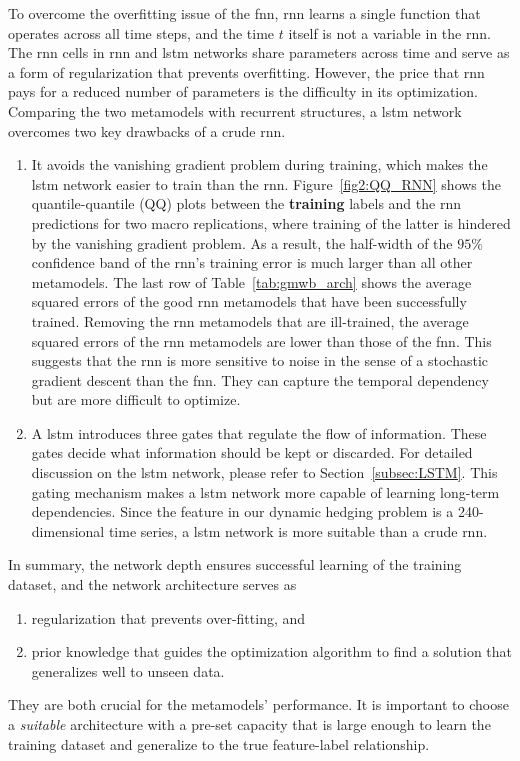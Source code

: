 To overcome the overfitting issue of the \gls{fnn}, \gls{rnn} learns a single function that operates across all time steps, and the time $t$ itself is not a variable in the \gls{rnn}.
The \gls{rnn} cells in \gls{rnn} and \gls{lstm} networks share parameters across time and serve as a form of regularization that prevents overfitting.
However, the price that \gls{rnn} pays for a reduced number of parameters is the difficulty in its optimization.
Comparing the two metamodels with recurrent structures, a \gls{lstm} network overcomes two key drawbacks of a crude \gls{rnn}.
\begin{enumerate}
    \item It avoids the vanishing gradient problem during training, which makes the \gls{lstm} network easier to train than the \gls{rnn}. Figure~\ref{fig2:QQ_RNN} shows the quantile-quantile (QQ) plots between the \textbf{training} labels and the \gls{rnn} predictions for two macro replications, where training of the latter is hindered by the vanishing gradient problem. 
    As a result, the half-width of the $95\%$ confidence band of the \gls{rnn}'s training error is much larger than all other metamodels. 
    The last row of Table~\ref{tab:gmwb_arch} shows the average squared errors of the good \gls{rnn} metamodels that have been successfully trained. 
    Removing the \gls{rnn} metamodels that are ill-trained, the average squared errors of the \gls{rnn} metamodels are lower than those of the \gls{fnn}.
    This suggests that the \gls{rnn} is more sensitive to noise in the sense of a stochastic gradient descent than the \gls{fnn}.
    They can capture the temporal dependency but are more difficult to optimize.
    \item A \gls{lstm} introduces three gates that regulate the flow of information. 
    These gates decide what information should be kept or discarded.
    For detailed discussion on the \gls{lstm} network, please refer to Section~\ref{subsec:LSTM}.
    This gating mechanism makes a \gls{lstm} network more capable of learning long-term dependencies. 
    Since the feature in our dynamic hedging problem is a 240-dimensional time series, a \gls{lstm} network is more suitable than a crude \gls{rnn}.
\end{enumerate}
In summary, the network depth ensures successful learning of the training dataset, and the network architecture serves as 
\begin{enumerate}
    \item regularization that prevents over-fitting, and 
    \item prior knowledge that guides the optimization algorithm to find a solution that generalizes well to unseen data.
\end{enumerate}
They are both crucial for the metamodels' performance.
It is important to choose a \textit{suitable} architecture with a pre-set capacity that is large enough to learn the training dataset and generalize to the true feature-label relationship.

